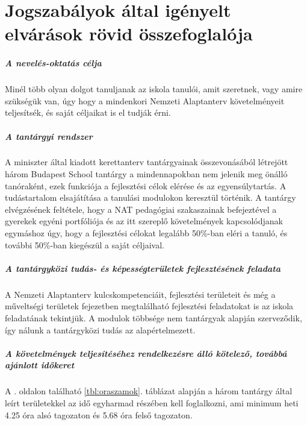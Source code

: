 \chapter{Jogszabályok által igényelt elvárások rövid összefoglalója}
\paragraph{A nevelés-oktatás célja}

Minél több olyan dolgot tanuljanak az iskola tanulói, amit szeretnek, vagy amire szükségük van, úgy hogy a mindenkori Nemzeti Alaptanterv követelményeit teljesítsék, és saját céljaikat is el tudják érni.

\paragraph{A tantárgyi rendszer}

A miniszter által kiadott kerettanterv tantárgyainak összevonásából létrejött három Budapest School tantárgy a mindennapokban nem jelenik meg önálló tanóraként, ezek funkciója a fejlesztési célok elérése és az egyensúlytartás. A tudástartalom elsajátítása a tanulási modulokon keresztül történik. A tantárgy elvégzésének feltétele, hogy a NAT pedagógiai szakaszainak befejeztével a gyerekek egyéni portfóliója és az itt szereplő követelmények kapcsolódjanak egymáshoz úgy, hogy a fejlesztési célokat legalább 50\%-ban eléri a tanuló, és további 50\%-ban kiegészül a saját céljaival.

\paragraph{A tantárgyközi tudás- és képességterületek fejlesztésének feladata}

A Nemzeti Alaptanterv kulcskompetenciáit, fejlesztési területeit és még a műveltségi területek fejezetben megtalálható fejlesztési feladatokat is az iskola feladatának tekintjük. A modulok többsége nem tantárgyak alapján szerveződik, így nálunk a tantárgyközi tudás az alapértelmezett.

\paragraph{A követelmények teljesítéséhez rendelkezésre álló kötelező, továbbá ajánlott időkeret}

A \pageref{tbl:oraszamok}. oldalon található \ref{tbl:oraszamok}. táblázat alapján a három tantárgy által leírt területekkel az idő egyharmad részében kell foglalkozni, ami minimum heti 4.25 óra alsó tagozaton és 5.68 óra felső tagozaton.

